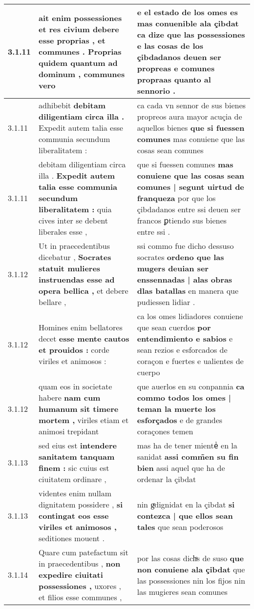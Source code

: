 \begin{tabular}{|p{1cm}|p{6.5cm}|p{6.5cm}|}
3.1.11 & ait enim possessiones \textbf{ et res civium debere esse proprias , et communes . } Proprias quidem quantum ad dominum , communes vero & e el estado de los omes es mas conuenible ala çibdat \textbf{ ca dize que las possessiones e las cosas de los çibdadanos deuen ser propreas } e comunes propraas quanto al sennorio . \\\hline
3.1.11 & adhibebit \textbf{ debitam diligentiam circa illa . } Expedit autem talia esse communia secundum liberalitatem : & ca cada vn sennor de sus bienes propreos aura mayor acuçia de aquellos bienes \textbf{ que si fuessen comunes } mas conuiene que las cosas sean comunes \\\hline
3.1.11 & debitam diligentiam circa illa . \textbf{ Expedit autem talia esse communia secundum liberalitatem : } quia cives inter se debent liberales esse , & que si fuessen comunes \textbf{ mas conuiene que las cosas sean comunes | segunt uirtud de franqueza } por que los çibdadanos entre ssi deuen ser francos ꝑtiendo sus bienes entre ssi . \\\hline
3.1.12 & Ut in praecedentibus dicebatur , \textbf{ Socrates statuit mulieres instruendas esse ad opera bellica , } et debere bellare , & ssi commo fue dicho dessuso socrates \textbf{ ordeno que las mugers deuian ser enssennadas | alas obras dlas batallas } en manera que pudiessen lidiar . \\\hline
3.1.12 & Homines enim bellatores decet \textbf{ esse mente cautos et prouidos : } corde viriles et animosos : & ca los omes lidiadores conuiene que sean cuerdos \textbf{ por entendimiento e sabios } e sean rezios e esforcados de coraçon e fuertes e ualientes de cuerpo \\\hline
3.1.12 & quam eos in societate habere \textbf{ nam cum humanum sit timere mortem , } viriles etiam et animosi trepidant & que auerlos en su conpannia \textbf{ ca commo todos los omes | teman la muerte los esforçados } e de grandes coraçones temen \\\hline
3.1.13 & sed eius est \textbf{ intendere sanitatem tanquam finem : } sic cuius est ciuitatem ordinare , & mas ha de tener mienteᷤ en la sanidat \textbf{ assi comm̃en su fin bien } assi aquel que ha de ordenar la çibdat \\\hline
3.1.13 & videntes enim nullam dignitatem possidere , \textbf{ si contingat eos esse viriles et animosos , } seditiones mouent . & nin gͤdignidat en la çibdat \textbf{ si contezca | que ellos sean tales } que sean poderosos \\\hline
3.1.14 & Quare cum patefactum sit in praecedentibus , \textbf{ non expedire ciuitati possessiones , } uxores , et filios esse communes , & por las cosas dichͣs de suso \textbf{ que non conuiene ala çibdat } que las possessiones nin los fijos nin las mugieres sean comunes \\\hline

\end{tabular}

